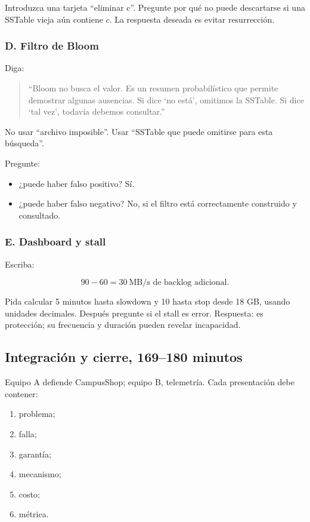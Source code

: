 \documentclass[variant=docente,cover=institutional,mode=screen]{ua-engineering-v6-article}
\begin{document}
Introduzca una tarjeta ``eliminar c''. Pregunte por qué no puede descartarse si una SSTable vieja aún contiene $c$. La respuesta deseada es evitar resurrección.

\subsubsection*{D. Filtro de Bloom}

Diga:

\begin{quote}
``Bloom no busca el valor. Es un resumen probabilístico que permite demostrar algunas ausencias. Si dice `no está', omitimos la SSTable. Si dice `tal vez', todavía debemos consultar.''
\end{quote}

No usar ``archivo imposible''. Usar ``SSTable que puede omitirse para esta búsqueda''.

Pregunte:

\begin{itemize}
\item ¿puede haber falso positivo? Sí.
\item ¿puede haber falso negativo? No, si el filtro está correctamente construido y consultado.
\end{itemize}

\subsubsection*{E. Dashboard y stall}

Escriba:

\[
90-60=30\ \text{MB/s de backlog adicional}.
\]

Pida calcular 5 minutos hasta slowdown y 10 hasta stop desde 18 GB, usando unidades decimales. Después pregunte si el stall es error. Respuesta: es protección; su frecuencia y duración pueden revelar incapacidad.

\subsection{Integración y cierre, 169--180 minutos}

Equipo A defiende CampusShop; equipo B, telemetría. Cada presentación debe contener:

\begin{enumerate}
\item problema;
\item falla;
\item garantía;
\item mecanismo;
\item costo;
\item métrica.
\end{enumerate}
\end{document}

